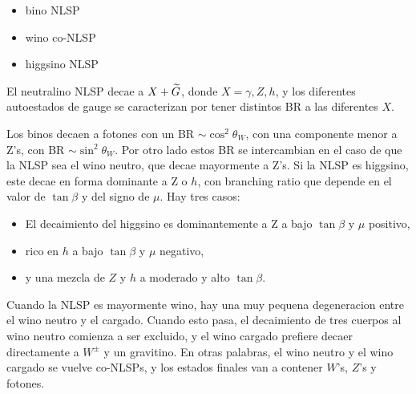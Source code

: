 \begin{itemize}
\item bino NLSP
\item wino co-NLSP
\item higgsino NLSP
\end{itemize}



El neutralino NLSP decae a $X + \widetilde{G}$, donde $X=\gamma, Z, h$, y los
diferentes autoestados de gauge se caracterizan por tener distintos
BR a las diferentes $X$.


Los binos decaen a fotones con un BR $\sim \cos^2\theta_W$, con una componente menor a Z's, con
BR $\sim \sin^2\theta_W$.
Por otro lado estos BR se intercambian en el caso de que la NLSP sea el wino neutro, que decae
mayormente a Z's.
Si la NLSP es higgsino, este decae en forma dominante a Z o $h$, con branching ratio que depende
en el valor de $\tan\beta$ y del signo de $\mu$. Hay tres casos:

\begin{itemize}
\item El decaimiento del higgsino es dominantemente a Z a bajo $\tan\beta$ y $\mu$ positivo,
\item rico en $h$ a bajo $\tan\beta$ y $\mu$ negativo,
\item y una mezcla de $Z$ y $h$ a moderado y alto $\tan\beta$.
\end{itemize}

Cuando la NLSP es mayormente wino, hay una muy pequena degeneracion entre el wino neutro y el
cargado. Cuando esto pasa, el decaimiento de tres cuerpos al wino neutro comienza
a ser excluido, y el wino cargado prefiere decaer directamente a $W^{\pm}$ y un gravitino.
En otras palabras, el wino neutro y el wino cargado se vuelve co-NLSPs, y los estados finales van
a contener $W$'s, $Z$'s y fotones.

